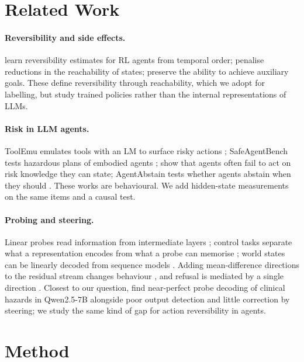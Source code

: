 \documentclass[11pt]{article}
\begin{document}
\section{Related Work}
\paragraph{Reversibility and side effects.} \citet{grinsztajn2021reversibility} learn reversibility estimates for RL agents from temporal order; \citet{krakovna2018relativereachability} penalise reductions in the reachability of states; \citet{turner2020conservative} preserve the ability to achieve auxiliary goals. These define reversibility through reachability, which we adopt for labelling, but study trained policies rather than the internal representations of LLMs.

\paragraph{Risk in LLM agents.} ToolEmu emulates tools with an LM to surface risky actions \citep{ruan2024toolemu}; SafeAgentBench tests hazardous plans of embodied agents \citep{yin2024safeagentbench}; \citet{tang2025riskknowledge} show that agents often fail to act on risk knowledge they can state; AgentAbstain tests whether agents abstain when they should \citep{liu2026agentabstain}. These works are behavioural. We add hidden-state measurements on the same items and a causal test.

\paragraph{Probing and steering.} Linear probes read information from intermediate layers \citep{alain2016probes}; control tasks separate what a representation encodes from what a probe can memorise \citep{hewitt2019controltasks}; world states can be linearly decoded from sequence models \citep{li2023othello}. Adding mean-difference directions to the residual stream changes behaviour \citep{rimsky2024caa}, and refusal is mediated by a single direction \citep{arditi2024refusal}. Closest to our question, \citet{basu2026actionability} find near-perfect probe decoding of clinical hazards in Qwen2.5-7B alongside poor output detection and little correction by steering; we study the same kind of gap for action reversibility in agents.

\section{Method}
\label{sec:method}
\end{document}
